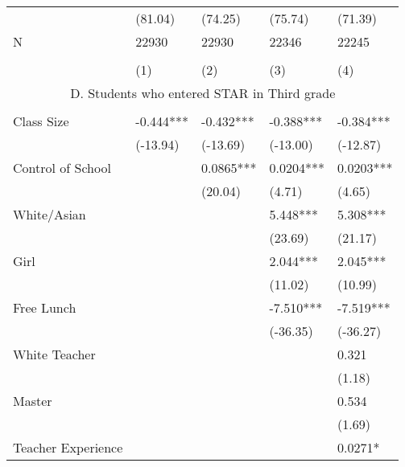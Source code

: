 \documentclass{article}
\begin{document}
{{{{{{{{{{{{{{{{{{\begin{table}[htbp]
\begin{tabular}{lllrr}
          & (81.04) & (74.25) & \multicolumn{1}{l}{(75.74)} & \multicolumn{1}{l}{(71.39)} \\
    N     & 22930 & 22930 & \multicolumn{1}{l}{22346} & \multicolumn{1}{l}{22245} \\
          &       &       &       &  \\
          & (1)   & (2)   & \multicolumn{1}{l}{(3)} & \multicolumn{1}{l}{(4)} \\
    \midrule
    \multicolumn{5}{c}{D. Students who entered STAR in Third grade} \\
          &       &       &       &  \\
    Class Size & -0.444*** & -0.432*** & \multicolumn{1}{l}{-0.388***} & \multicolumn{1}{l}{-0.384***} \\
          & (-13.94) & (-13.69) & \multicolumn{1}{l}{(-13.00)} & \multicolumn{1}{l}{(-12.87)} \\
    Control of School &       & 0.0865*** & \multicolumn{1}{l}{0.0204***} & \multicolumn{1}{l}{0.0203***} \\
          &       & (20.04) & \multicolumn{1}{l}{(4.71)} & \multicolumn{1}{l}{(4.65)} \\
    White/Asian &       &       & \multicolumn{1}{l}{5.448***} & \multicolumn{1}{l}{5.308***} \\
          &       &       & \multicolumn{1}{l}{(23.69)} & \multicolumn{1}{l}{(21.17)} \\
    Girl  &       &       & \multicolumn{1}{l}{2.044***} & \multicolumn{1}{l}{2.045***} \\
          &       &       & \multicolumn{1}{l}{(11.02)} & \multicolumn{1}{l}{(10.99)} \\
    Free Lunch &       &       & \multicolumn{1}{l}{-7.510***} & \multicolumn{1}{l}{-7.519***} \\
          &       &       & \multicolumn{1}{l}{(-36.35)} & \multicolumn{1}{l}{(-36.27)} \\
    White Teacher &       &       & \multicolumn{1}{l}{} & \multicolumn{1}{l}{0.321} \\
          &       &       & \multicolumn{1}{l}{} & \multicolumn{1}{l}{(1.18)} \\
    Master &       &       & \multicolumn{1}{l}{} & \multicolumn{1}{l}{0.534} \\
          &       &       & \multicolumn{1}{l}{} & \multicolumn{1}{l}{(1.69)} \\
    Teacher Experience &       &       & \multicolumn{1}{l}{} & \multicolumn{1}{l}{0.0271*} \\

\end{tabular}
\end{table}}}}}}}}}}}}}}}}}}}
\end{document}
